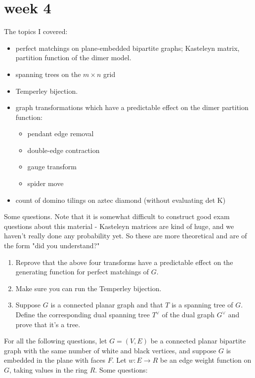 \documentclass[12pt]{article}
\begin{document}
\section{week 4}

The topics I covered:

\begin{itemize}
	\item perfect matchings on plane-embedded bipartite graphs; Kasteleyn matrix, partition function of the dimer model.
	\item spanning trees on the $m \times n$ grid
	\item Temperley bijection.
	\item graph transformations which have a predictable effect on the dimer partition function:
	\begin{itemize}
		\item pendant edge removal
		\item double-edge contraction
		\item gauge transform
		\item spider move
	\end{itemize}
	\item count of domino tilings on aztec diamond (without evaluating det K)
\end{itemize}

Some questions.  Note that it is somewhat difficult to construct good exam questions about this material - Kasteleyn matrices are kind of huge, and we haven't really done any probability yet.  So these are more theoretical and are of the form "did you understand?"

\begin{enumerate}
	\item Reprove that the above four transforms have a predictable effect on the generating function for perfect matchings of $G$.
	\item Make sure you can run the Temperley bijection.
	\item Suppose $G$ is a connected planar graph and that $T$ is a spanning tree of $G$.  Define the corresponding dual spanning tree $T^{\vee}$ of the dual graph $G^{\vee}$ and prove that it's a tree.
\end{enumerate}

For all the following questions, let $G=(V,E)$ be a connected planar bipartite graph with the same number of white and black vertices, and suppose $G$ is embedded in the plane with faces $F$.  Let $w:E \rightarrow R$ be an edge weight function on $G$, taking values in the ring $R$.  Some questions:
\end{document}
